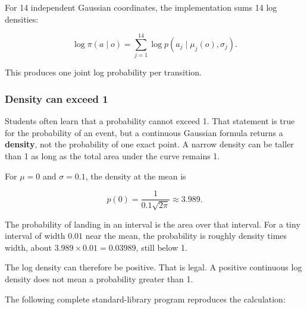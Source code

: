 \documentclass[
  american,
  11pt,
  letterpaper,
]{article}
\begin{document}
For 14 independent Gaussian coordinates, the implementation sums 14 log
densities:

\[
\log\pi(a\mid o)
=
\sum_{j=1}^{14}\log p(a_j\mid\mu_j(o),\sigma_j).
\]

This produces one joint log probability per transition.

\subsubsection{Density can exceed 1}\label{density-can-exceed-1}

Students often learn that a probability cannot exceed 1. That statement
is true for the probability of an event, but a continuous Gaussian
formula returns a \textbf{density}, not the probability of one exact
point. A narrow density can be taller than 1 as long as the total area
under the curve remains 1.

For \(\mu=0\) and \(\sigma=0.1\), the density at the mean is

\[
p(0)=\frac{1}{0.1\sqrt{2\pi}}\approx3.989.
\]

The probability of landing in an interval is the area over that
interval. For a tiny interval of width \(0.01\) near the mean, the
probability is roughly density times width, about
\(3.989\times0.01=0.03989\), still below 1.

The log density can therefore be positive. That is legal. A positive
continuous log density does not mean a probability greater than 1.

The following complete standard-library program reproduces the
calculation:
\end{document}
